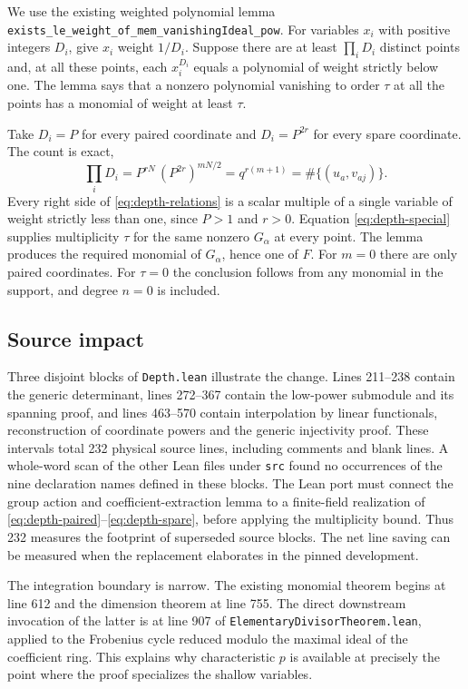 \documentclass[11pt,letterpaper]{article}
\begin{document}
We use the existing weighted polynomial lemma \texttt{exists\_le\_weight\_of\_mem\_}\allowbreak\texttt{vanishingIdeal\_pow}. For variables $x_i$ with positive integers $D_i$, give $x_i$ weight $1/D_i$. Suppose there are at least $\prod_i D_i$ distinct points and, at all these points, each $x_i^{D_i}$ equals a polynomial of weight strictly below one. The lemma says that a nonzero polynomial vanishing to order $\tau$ at all the points has a monomial of weight at least $\tau$.

Take $D_i=P$ for every paired coordinate and $D_i=P^{2r}$ for every spare coordinate. The count is exact,
\[
 \prod_iD_i
   =P^{rN}\,(P^{2r})^{mN/2}
   =q^{r(m+1)}
   =\#\{(u_a,v_{aj})\}.
\]
Every right side of \eqref{eq:depth-relations} is a scalar multiple of a single variable of weight strictly less than one, since $P>1$ and $r>0$. Equation \eqref{eq:depth-special} supplies multiplicity $\tau$ for the same nonzero $G_\alpha$ at every point. The lemma produces the required monomial of $G_\alpha$, hence one of $F$. For $m=0$ there are only paired coordinates. For $\tau=0$ the conclusion follows from any monomial in the support, and degree $n=0$ is included.

\subsection{Source impact}



Three disjoint blocks of \texttt{Depth.lean} illustrate the change. Lines 211--238 contain the generic determinant, lines 272--367 contain the low-power submodule and its spanning proof, and lines 463--570 contain interpolation by linear functionals, reconstruction of coordinate powers and the generic injectivity proof. These intervals total 232 physical source lines, including comments and blank lines. A whole-word scan of the other Lean files under \texttt{src} found no occurrences of the nine declaration names defined in these blocks. The Lean port must connect the group action and coefficient-extraction lemma to a finite-field realization of \eqref{eq:depth-paired}--\eqref{eq:depth-spare}, before applying the multiplicity bound. Thus 232 measures the footprint of superseded source blocks. The net line saving can be measured when the replacement elaborates in the pinned development.

The integration boundary is narrow. The existing monomial theorem begins at line 612 and the dimension theorem at line 755. The direct downstream invocation of the latter is at line 907 of \texttt{ElementaryDivisorTheorem.lean}, applied to the Frobenius cycle reduced modulo the maximal ideal of the coefficient ring. This explains why characteristic $p$ is available at precisely the point where the proof specializes the shallow variables.
\end{document}
